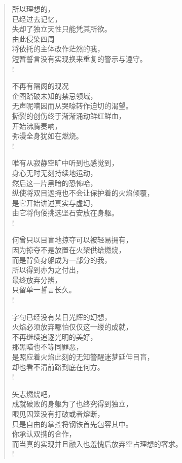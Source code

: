 \documentclass[UTF8, 12pt, a4paper]{ctexrep} %
\begin{document}
\begin{verse}
    所以理想的，\\
    已经过去记忆，\\
    失却了独立天性只能凭其所欲。\\
    由此侵染四周\\
    将依托的主体改作茫然的我，\\
    短暂誓言没有实现换来重复的警示与遵守。\\!

    不再有隔阂的现况\\
    企图踏破未知的禁忌领域，\\
    无声呢喃因而从哭嚎转作迫切的渴望。\\
    撕裂的创伤终于渐渐涌动鲜红鲜血，\\
    开始沸腾奏响，\\
    弥漫全身犹如在燃烧。\\!

    唯有从寂静空旷中听到也感觉到，\\
    身心无时无刻持续地运动，\\
    然后这一片黑暗的恐怖哈，\\
    纵使将双目遮掩也不会让保护着的火焰倾覆，\\
    是它开始讲述真实与虚幻，\\
    由它将佝偻挑选坚石安放在身躯。\\!

    何曾只以目盲地掠夺可以被轻易拥有，\\
    因为掠夺不是放置在火架供给燃烧，\\
    而是背负身躯成为一部分的我，\\
    所以得到亦为之付出，\\
    最终放弃分辨，\\
    只留单一誓言长久。\\!

    字句已经没有某日光辉的幻想，\\
    火焰必须放弃哪怕仅仅这一缕的成就，\\
    不再继续追逐光明的美好，\\
    那黑暗也不等同罪恶，\\
    是照应着火焰此刻的无知警醒迷梦延伸目盲，\\
    却也看不清前路到底在何方。\\!

    矢志燃烧吧，\\
    成就破败的身躯为了也终究得到独立，\\
    眼见囚笼没有打破或者熔断，\\
    只是自由的掌控将钢铁首先包容其中。\\
    你承认双携的合作，\\
    而当真的实现并且融入也羞愧后放弃空占理想的奢求。\\!


\end{verse}
\end{document}
